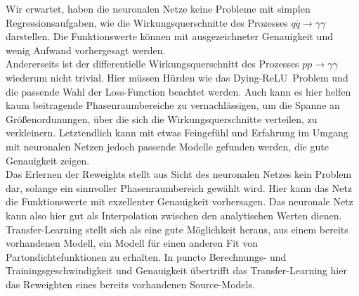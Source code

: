 Wir erwartet, haben die neuronalen Netze keine Probleme mit simplen Regressionsaufgaben, wie die Wirkungsquerschnitte des Prozesses $q\overline{q} \rightarrow \gamma \gamma$ darstellen. Die Funktionswerte können mit ausgezeichneter Genauigkeit und wenig Aufwand vorhergesagt werden.\\
Andererseits ist der differentielle Wirkungsquerschnitt des Prozesses $pp \rightarrow \gamma \gamma$ wiederum nicht trivial. Hier müssen Hürden wie das \glqq Dying-ReLU\grqq~Problem und die passende Wahl der Loss-Function beachtet werden. Auch kann es hier helfen kaum beitragende Phasenraumbereiche zu vernachlässigen, um die Spanne an Größenordunungen, über die sich die Wirkungsquerschnitte verteilen, zu verkleinern. Letztendlich kann mit etwas Feingefühl und Erfahrung im Umgang mit neuronalen Netzen jedoch passende Modelle gefunden werden, die gute Genauigkeit zeigen.\\
Das Erlernen der Reweights stellt aus Sicht des neuronalen Netzes kein Problem dar, solange ein sinnvoller Phasenraumbereich gewählt wird. Hier kann das Netz die Funktionswerte mit exzellenter Genauigkeit vorhersagen. Das neuronale Netz kann also hier gut als Interpolation zwischen den analytischen Werten dienen. \\
Transfer-Learning stellt sich als eine gute Möglichkeit heraus, aus einem bereits vorhandenen Modell, ein Modell für einen anderen Fit von Partondichtefunktionen zu erhalten. In puncto Berechnungs- und Trainingsgeschwindigkeit und Genauigkeit übertrifft das Transfer-Learning hier das Reweighten eines bereits vorhandenen Source-Models.

